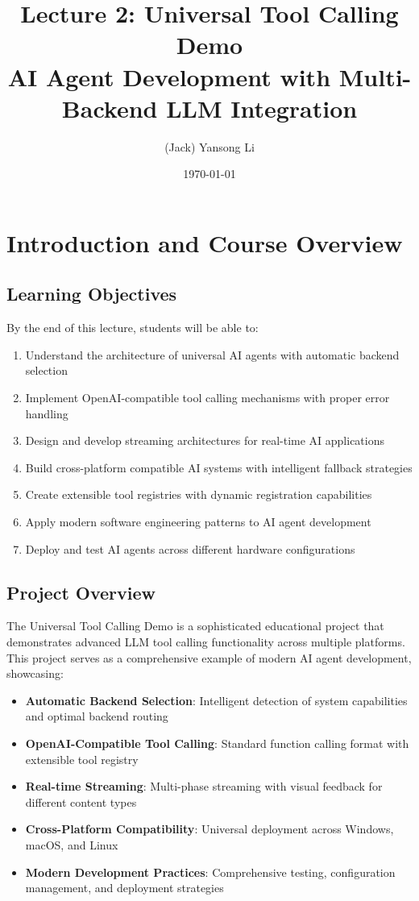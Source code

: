 \documentclass{article}
\title{Lecture 2: Universal Tool Calling Demo\\AI Agent Development with Multi-Backend LLM Integration}
\author{(Jack) Yansong Li}
\date{\today}
\begin{document}
\maketitle

\section{Introduction and Course Overview}

\subsection{Learning Objectives}

By the end of this lecture, students will be able to:

\begin{enumerate}[label=\arabic*.]
    \item Understand the architecture of universal AI agents with automatic backend selection
    \item Implement OpenAI-compatible tool calling mechanisms with proper error handling
    \item Design and develop streaming architectures for real-time AI applications
    \item Build cross-platform compatible AI systems with intelligent fallback strategies
    \item Create extensible tool registries with dynamic registration capabilities
    \item Apply modern software engineering patterns to AI agent development
    \item Deploy and test AI agents across different hardware configurations
\end{enumerate}

\subsection{Project Overview}

The Universal Tool Calling Demo is a sophisticated educational project that demonstrates advanced LLM tool calling functionality across multiple platforms. This project serves as a comprehensive example of modern AI agent development, showcasing:

\begin{itemize}
    \item \textbf{Automatic Backend Selection}: Intelligent detection of system capabilities and optimal backend routing
    \item \textbf{OpenAI-Compatible Tool Calling}: Standard function calling format with extensible tool registry
    \item \textbf{Real-time Streaming}: Multi-phase streaming with visual feedback for different content types
    \item \textbf{Cross-Platform Compatibility}: Universal deployment across Windows, macOS, and Linux
    \item \textbf{Modern Development Practices}: Comprehensive testing, configuration management, and deployment strategies
\end{itemize}
\end{document}
